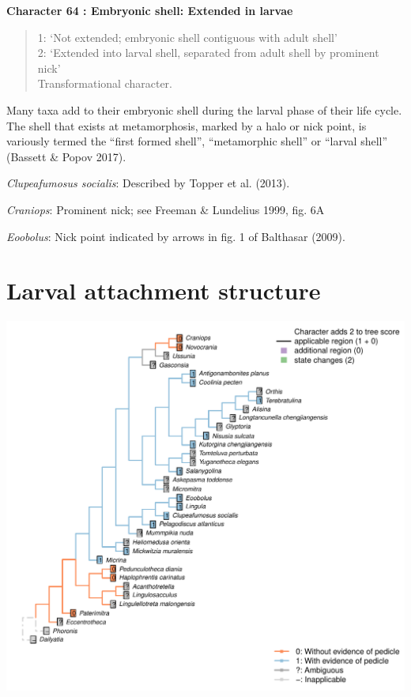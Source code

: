 \documentclass[]{book}
\theoremstyle{definition}
\theoremstyle{definition}
\theoremstyle{definition}
\theoremstyle{remark}
\begin{document}
\textbf{Character 64 : Embryonic shell: Extended in larvae }

\begin{quote}
1: `Not extended; embryonic shell contiguous with adult shell'\\
2: `Extended into larval shell, separated from adult shell by prominent
nick'\\
Transformational character.
\end{quote}

Many taxa add to their embryonic shell during the larval phase of their
life cycle. The shell that exists at metamorphosis, marked by a halo or
nick point, is variously termed the ``first formed shell'',
``metamorphic shell'' or ``larval shell'' (Bassett \& Popov 2017).

\emph{Clupeafumosus socialis}: Described by Topper et al. (2013).

\emph{Craniops}: Prominent nick; see Freeman \& Lundelius 1999, fig. 6A

\emph{Eoobolus}: Nick point indicated by arrows in fig. 1 of Balthasar
(2009).

\hypertarget{larval-attachment-structure}{%
\section*{Larval attachment
structure}\label{larval-attachment-structure}}

\includegraphics{Brachiopod_phylogeny_files/figure-latex/unnamed-chunk-5-65.pdf}
\end{document}
